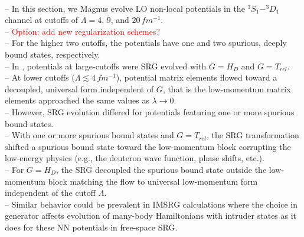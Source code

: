 \documentclass[preprintnumbers,floatfix,aps,prc,preprint,nofootinbib]{revtex4-1}
\begin{document}
\\
-- In this section, we Magnus evolve LO non-local potentials in the $^{3}S_1-^{3}D_1$ channel at cutoffs of $\Lambda=4$, $9$, and $20 \, fm^{-1}$.
\\
\textcolor{red}{%
-- Option: add new regularization schemes?
}
\\
-- For the higher two cutoffs, the potentials have one and two spurious, deeply bound states, respectively.
\\
-- In \cite{Wendt:2011qj}, potentials at large-cutoffs were SRG evolved with $G=H_D$ and $G=T_{rel}$.
\\
-- At lower cutoffs ($\Lambda \lesssim 4 \, fm^{-1}$), potential matrix elements flowed toward a decoupled, universal form independent of $G$, that is the low-momentum matrix elements approached the same values as $\lambda \rightarrow 0$.
\\
-- However, SRG evolution differed for potentials featuring one or more spurious bound states.
\\
-- With one or more spurious bound states and $G=T_{rel}$, the SRG transformation shifted a spurious bound state toward the low-momentum block corrupting the low-energy physics (e.g., the deuteron wave function, phase shifts, etc.).
\\
-- For $G=H_D$, the SRG decoupled the spurious bound state outside the low-momentum block matching the flow to universal low-momentum form independent of the cutoff $\Lambda$.
\\
-- Similar behavior could be prevalent in IMSRG calculations where the choice in generator affects evolution of many-body Hamiltonians with intruder states as it does for these NN potentials in free-space SRG.
\\
\end{document}
